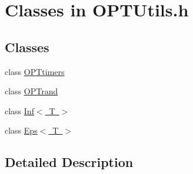 \hypertarget{group___o_p_t_utils___c_l_a_s_s_e_s}{}\section{Classes in O\+P\+T\+Utils.\+h}
\label{group___o_p_t_utils___c_l_a_s_s_e_s}
\subsection*{Classes}
\begin{DoxyCompactItemize}
\item 
class \mbox{\hyperlink{class_o_p_ttypes__di__unipi__it_1_1_o_p_ttimers}{O\+P\+Ttimers}}
\item 
class \mbox{\hyperlink{class_o_p_ttypes__di__unipi__it_1_1_o_p_trand}{O\+P\+Trand}}
\item 
class \mbox{\hyperlink{class_o_p_ttypes__di__unipi__it_1_1_inf}{Inf$<$ T $>$}}
\item 
class \mbox{\hyperlink{class_o_p_ttypes__di__unipi__it_1_1_eps}{Eps$<$ T $>$}}
\end{DoxyCompactItemize}


\subsection{Detailed Description}
